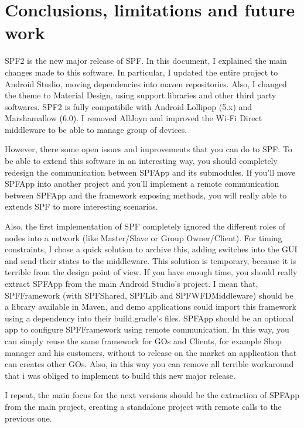 \chapter{Conclusions, limitations and future work}
\label{conclusion}

SPF2 is the new major release of SPF. In this document, I explained the main changes made to this software. In particular, I updated the entire project to Android Studio, moving dependencies into maven repositories. Also, I changed the theme to Material Design, using support libraries and other third party softwares. SPF2 is fully compatibile with Android Lollipop (5.x) and Marshamallow (6.0). I removed AllJoyn and improved the Wi-Fi Direct middleware to be able to manage group of devices.

However, there some open issues and improvements that you can do to SPF. To be able to extend this software in an interesting way, you should completely redesign the communication between SPFApp and its submodules. If you'll move SPFApp into another project and you'll implement a remote communication between SPFApp and the framework exposing methods, you will really able to extends SPF to more interesting scenarios.

Also, the first implementation of SPF completely ignored the different roles of nodes into a network (like Master/Slave or Group Owner/Client). For timing constraints, I chose a quick solution to archive this, adding switches into the GUI and send their states to the middleware. This solution is temporary, because it is terrible from the design point of view. If you have enough time, you should really extract \textsf{SPFApp} from the main Android Studio's project. I mean that, \textsf{SPFFramework} (with \textsf{SPFShared}, \textsf{SPFLib} and \textsf{SPFWFDMiddleware}) should be a library available in Maven, and demo applications could import this framework using a dependency into their \textsf{build.gradle}'s files. \textsf{SPFApp} should be an optional app to configure \textsf{SPFFramework} using remote communication. In this way, you can simply reuse the same framework for GOs and Clients, for example Shop manager and his customers, without to release on the market an application that can creates other GOs. Also, in this way you can remove all terrible workaround that i was obliged to implement to build this new major release.

I repeat, the main focus for the next versions should be the extraction of \textsf{SPFApp} from the main project, creating a standalone project with remote calls to the previous one.